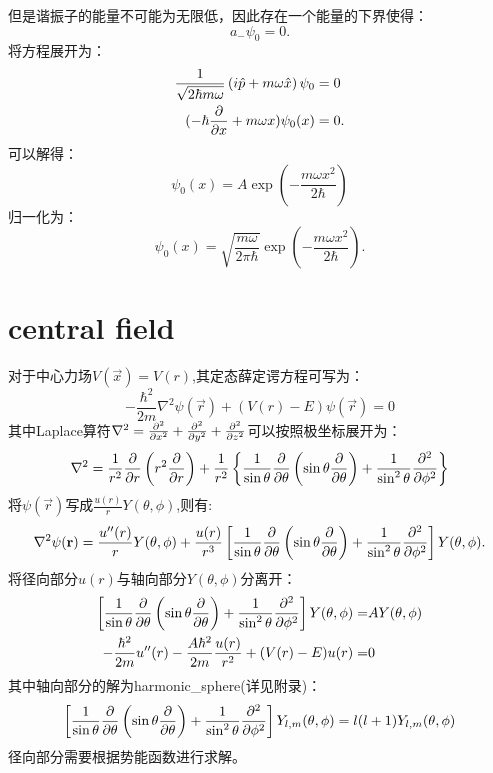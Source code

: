 但是谐振子的能量不可能为无限低，因此存在一个能量的下界使得：
\begin{equation}
    a_-\psi_0=0.
\end{equation}
将方程展开为：
\begin{equation}
    \begin{aligned}
        \frac{1}{\sqrt{2\hbar m\omega}}\left(i\hat{p}+m\omega \hat{x}\right)\psi_0&=0\\
        (-\hbar\frac{\partial }{\partial x}+m\omega x)\psi_0(x)&=0.
    \end{aligned}
\end{equation}
可以解得：
\begin{equation}
    \psi_0(x)=A\exp\left(-\frac{m\omega x^2}{2\hbar}\right)
\end{equation}
归一化为：
\begin{equation}
    \psi_0(x)=\sqrt{\frac{m\omega}{2\pi\hbar}}\exp\left(-\frac{m\omega x^2}{2\hbar}\right).
\end{equation}

\section{central field}
对于中心力场$V(\vec{x})=V(r)$,其定态薛定谔方程可写为：
\begin{equation}
    -\frac{\hbar^2}{2m}\nabla^2\psi(\vec{r})+(V(r)-E)\psi(\vec{r})=0
\end{equation}
其中Laplace算符$\nabla^2=\frac{\partial^2 }{\partial x^2}+\frac{\partial^2 }{\partial y^2}+\frac{\partial^2 }{\partial z^2}$可以按照极坐标展开为：
\begin{equation}
    \nabla^2=\frac{1}{r^2}\frac{\partial }{\partial r}\left(r^2\frac{\partial }{\partial r}\right)+\frac{1}{r^2}\left\lbrace \frac{1}{\sin\theta}\frac{\partial }{\partial \theta}\left(\sin\theta\frac{\partial }{\partial \theta}\right)+\frac{1}{\sin^2\theta}\frac{\partial^2 }{\partial \phi^2}\right\rbrace
\end{equation}
将$\psi(\vec{r})$写成$\frac{u(r)}{r}Y(\theta,\phi)$,则有:
\begin{equation}
    \nabla^2\psi(\mathbf{r})=\frac{u''(r)}{r}Y(\theta,\phi)+\frac{u(r)}{r^3}\left[ \frac{1}{\sin\theta}\frac{\partial }{\partial \theta}\left(\sin\theta\frac{\partial }{\partial \theta}\right)+\frac{1}{\sin^2\theta}\frac{\partial^2 }{\partial \phi^2}\right]Y(\theta,\phi).
\end{equation}
将径向部分$u(r)$与轴向部分$Y(\theta,\phi)$分离开：
\begin{align}
    \left[ \frac{1}{\sin\theta}\frac{\partial }{\partial \theta}\left(\sin\theta\frac{\partial }{\partial \theta}\right)+\frac{1}{\sin^2\theta}\frac{\partial^2 }{\partial \phi^2}\right]Y(\theta,\phi)=&AY(\theta,\phi)\\
    -\frac{\hbar^2}{2m}u''(r)-\frac{A\hbar^2}{2m}\frac{u(r)}{r^2}+(V(r)-E)u(r)=&0
\end{align}
其中轴向部分的解为\gls{harmonic_sphere}(详见附录)：
\begin{equation}
    \left[ \frac{1}{\sin\theta}\frac{\partial }{\partial \theta}\left(\sin\theta\frac{\partial }{\partial \theta}\right)+\frac{1}{\sin^2\theta}\frac{\partial^2 }{\partial \phi^2}\right]Y_{l,m}(\theta,\phi)=l(l+1)Y_{l,m}(\theta,\phi)
\end{equation}
径向部分需要根据势能函数进行求解。


